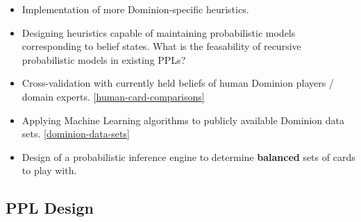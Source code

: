 





\begin{itemize}
\item Implementation of more Dominion-specific heuristics.
\item Designing heuristics capable of maintaining probabilistic models
      corresponding to belief states. What is the feasability of recursive
      probabilistic models in existing PPLs?
\item Cross-validation with currently held beliefs of human Dominion
      players / domain experts. \ref{human-card-comparisons}
\item Applying Machine Learning algorithms to publicly available Dominion
      data sets. \ref{dominion-data-sets}
\item Design of a probabilistic inference engine to determine
      {\bf balanced} sets of cards to play with.
\end{itemize}

\subsection{PPL Design} \label{sec:future:PPL}

